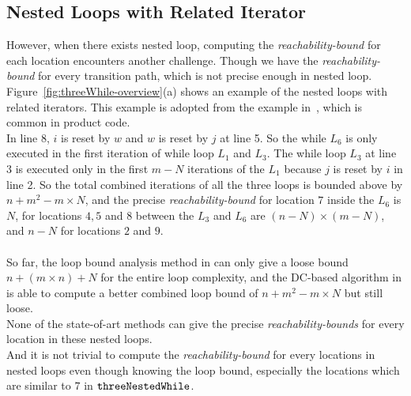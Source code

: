 \subsection{Nested Loops with Related Iterator}
\label{sec:overview-nestedwhile}
However, when there exists nested loop, computing the \emph{reachability-bound} for each location encounters another challenge.
Though we have
the \emph{reachability-bound} for every transition path, which is not precise enough in nested loop.
Figure~\ref{fig:threeWhile-overview}(a) shows an example of the nested loops with related 
iterators.
This example is adopted from the example in~\cite{GulwaniJK09}, which is common in product code.
\\
In line 8, $i$ is reset by $w$ and $w$ is reset by $j$ at line 5. So the
while $L_6$ is only executed in the first iteration of while loop $L_1$ and $L_3$.
The while loop $L_3$ at line 3 is executed only in 
the first $m - N$ iterations of the 
$L_1$ because $j$ is reset by $i$ in line 2.
So the total combined iterations of all the three loops is bounded above by 
$n + m^2 - m \times N$,
and the precise \emph{reachability-bound} for location $7$ inside the $L_6$ is $N$,
for locations $4, 5$ and $8$ between the $L_3$ and $L_6$ are $(n-N) \times (m - N)$,
and $n - N$ for locations $2$ and $9$.
\\
\\
So far, the loop bound analysis method in \cite{GulwaniJK09} can only give a loose bound $n + (m \times n) + N$ for the entire loop complexity, and 
the DC-based algorithm in \cite{sinn2017complexity} is able to
compute a better combined loop bound of $n + m^2 - m \times N$ but still loose.
\\
None of the state-of-art methods can give the precise \emph{reachability-bounds} for every location in these nested loops.
\\
And it is not trivial to compute the \emph{reachability-bound} for every locations in nested loops even though knowing the loop bound,
especially the locations which are similar to $7$ in $\mathtt{threeNestedWhile}$.
\\
